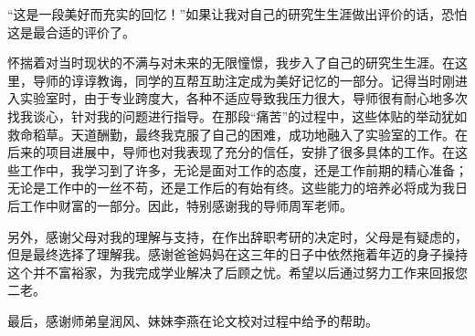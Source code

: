 \begin{thanks}

 “这是一段美好而充实的回忆！”如果让我对自己的研究生生涯做出评价的话，恐怕这是最合适的评价了。
 
 怀揣着对当时现状的不满与对未来的无限憧憬，我步入了自己的研究生生涯。在这里，导师的谆谆教诲，同学的互帮互助注定成为美好记忆的一部分。记得当时刚进入实验室时，由于专业跨度大，各种不适应导致我压力很大，导师很有耐心地多次找我谈心，针对我的问题进行指导。在那段“痛苦”的过程中，这些体贴的举动犹如救命稻草。天道酬勤，最终我克服了自己的困难，成功地融入了实验室的工作。在后来的项目进展中，导师也对我表现了充分的信任，安排了很多具体的工作。在这些工作中，我学习到了许多，无论是面对工作的态度，还是工作前期的精心准备；无论是工作中的一丝不苟，还是工作后的有始有终。这些能力的培养必将成为我日后工作中财富的一部分。因此，特别感谢我的导师周军老师。
 
 另外，感谢父母对我的理解与支持，在作出辞职考研的决定时，父母是有疑虑的，但是最终选择了理解我。感谢爸爸妈妈在这三年的日子中依然拖着年迈的身子操持这个并不富裕家，为我完成学业解决了后顾之忧。希望以后通过努力工作来回报您二老。
 
 最后，感谢师弟皇润风、妹妹李燕在论文校对过程中给予的帮助。
\end{thanks}
